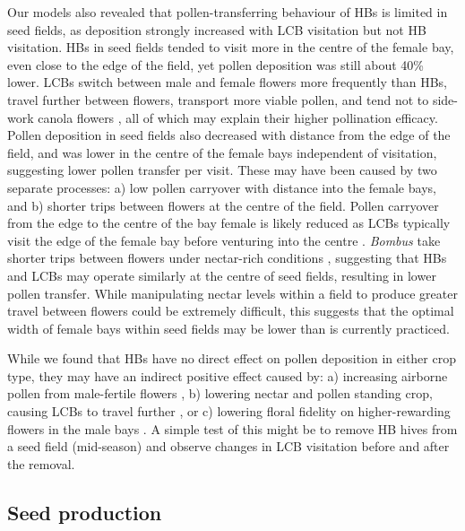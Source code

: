 \documentclass[12pt]{article} %
\begin{document}
Our models also revealed that pollen-transferring behaviour of HBs is limited in seed fields, as deposition strongly increased with LCB visitation but not HB visitation.
HBs in seed fields tended to visit more in the centre of the female bay, even close to the edge of the field, yet pollen deposition was still about 40\% lower.
LCBs switch between male and female flowers more frequently than HBs, travel further between flowers, transport more viable pollen, and tend not to side-work canola flowers \citep{soroka2001, parker2015, waytes2022, brunet2019}, all of which may explain their higher pollination efficacy.
Pollen deposition in seed fields also decreased with distance from the edge of the field, and was lower in the centre of the female bays independent of visitation, suggesting lower pollen transfer per visit.
These may have been caused by two separate processes: a) low pollen carryover with distance into the female bays, and b) shorter trips between flowers at the centre of the field.
Pollen carryover from the edge to the centre of the bay female is likely reduced as LCBs typically visit the edge of the female bay before venturing into the centre \citep{thomson1986, pinnisch1990}.
\textit{Bombus} take shorter trips between flowers under nectar-rich conditions \citep{pyke1978b, heinrich1979}, suggesting that HBs and LCBs may operate similarly at the centre of seed fields, resulting in lower pollen transfer.
While manipulating nectar levels within a field to produce greater travel between flowers could be extremely difficult, this suggests that the optimal width of female bays within seed fields may be lower than is currently practiced.

While we found that HBs have no direct effect on pollen deposition in either crop type, they may have an indirect positive effect caused by: a) increasing airborne pollen from male-fertile flowers \citep{pierre2010}, b) lowering nectar and pollen standing crop, causing LCBs to travel further \citep{pyke1978b, heinrich1979}, or c) lowering floral fidelity on higher-rewarding flowers in the male bays \citep{mesquida1978, waytes2022,gaffney2019}.
A simple test of this might be to remove HB hives from a seed field (mid-season) and observe changes in LCB visitation before and after the removal.

\subsection*{Seed production} %
\end{document}
